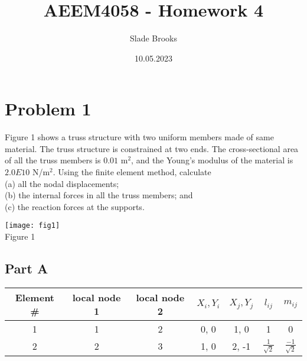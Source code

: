 \documentclass{article}
\title{AEEM4058 - Homework 4}
\author{Slade Brooks}
\date{10.05.2023}
\begin{document}
\maketitle

\section*{Problem 1}
Figure 1 shows a truss structure with two uniform members made of same material.
The truss structure is constrained at two ends. The cross-sectional area of all the
truss members is $0.01$ m$^2$, and the Young’s modulus of
the material is $2.0E10$ N/m$^2$. Using the finite element method, calculate \\
(a) all the nodal displacements; \\
(b) the internal forces in all the truss members; and \\
(c) the reaction forces at the supports.
\begin{center}
    \texttt{[image: fig1]} \\
    Figure 1
\end{center}
\subsection*{Part A}
\begin{tabular}{|c|c|c|c|c|c|c|}
    \hline
    Element \# & local node 1 & local node 2 & $X_i, Y_i$ & $X_j, Y_j$ & $l_{ij}$ & $m_{ij}$ \\
    \hline
    1 & 1 & 2 & 0, 0 & 1, 0 & 1 & 0 \\
    2 & 2 & 3 & 1, 0 & 2, -1 & $\frac{1}{\sqrt{2}}$ & $\frac{-1}{\sqrt{2}}$ \\
    \hline
\end{tabular}
\end{document}
